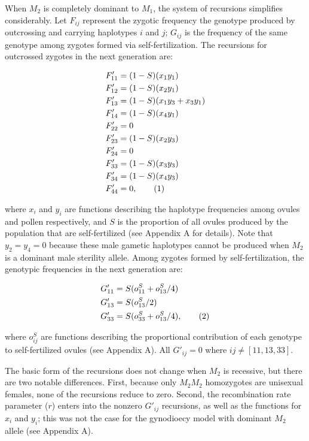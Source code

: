\documentclass{article}
\newcommand\numberthis{\addtocounter{equation}{1}\tag{\theequation}}
\begin{document}
When $M_2$ is completely dominant to $M_1$, the system of recursions simplifies considerably. Let $F_{ij}$ represent the zygotic frequency the genotype produced by outcrossing and carrying haplotypes $i$ and $j$; $G_{ij}$ is the frequency of the same genotype among zygotes formed via self-fertilization. The recursions for outcrossed zygotes in the next generation are:
\begin{linenomath}\begin{align*} \label{eq:FprGyn}
    F'_{11} &= (1 - S) (x_1 y_1)  \\
    F'_{12} &= (1 - S) (x_2 y_1)  \\
    F'_{13} &= (1 - S) (x_1 y_3 + x_3 y_1)  \\
    F'_{14} &= (1 - S) (x_4 y_1)  \\
    F'_{22} &= 0 \\
    F'_{23} &= (1 - S) (x_2 y_3)  \\
    F'_{24} &= 0 \\
    F'_{33} &= (1 - S) (x_3 y_3)  \\
    F'_{34} &= (1 - S) (x_4 y_3)  \\
    F'_{44} &= 0, \numberthis
\end{align*}\end{linenomath}

\noindent where $x_{i}$ and $y_{i}$ are functions describing the haplotype frequencies among ovules and pollen respectively, and $S$ is the proportion of all ovules produced by the population that are self-fertilized (see Appendix A for details). Note that $y_2=y_4=0$ because these male gametic haplotypes cannot be produced when $M_2$ is a dominant male sterility allele. Among zygotes formed by self-fertilization, the genotypic frequencies in the next generation are: 
\begin{linenomath}\begin{align*} \label{eq:GprGyn}
    G'_{11} &= S (o^S_{11} + o^S_{13}/4) \\
    G'_{13} &= S (o^S_{13}/2) \\
    G'_{33} &= S (o^S_{33} + o^S_{13}/4), \numberthis
\end{align*} \end{linenomath}

\noindent where $o^S_{ij}$ are functions describing the proportional contribution of each genotype to self-fertilized ovules (see Appendix A). All $G'_{ij} = 0$ where $ij \neq [11,13,33]$. 

The basic form of the recursions does not change when $M_2$ is recessive, but there are two notable differences. First, because only $M_2M_2$ homozygotes are unisexual females, none of the recursions reduce to zero. Second, the recombination rate parameter ($r$) enters into the nonzero $G'_{ij}$ recursions, as well as the functions for $x_i$ and $y_i$; this was not the case for the gynodioecy model with dominant $M_2$ allele (see Appendix A).
\end{document}
